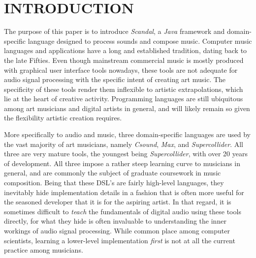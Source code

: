 \chapter{INTRODUCTION}

The purpose of this paper is to introduce \emph{Scandal}, a \emph{Java} framework and domain-specific language designed to process sounds and compose music. Computer music languages and applications have a long and established tradition, dating back to the late Fifties. Even though mainstream commercial music is mostly produced with graphical user interface tools nowadays, these tools are not adequate for audio signal processing with the specific intent of creating art music. The specificity of these tools render them inflexible to artistic extrapolations, which lie at the heart of creative activity. Programming languages are still ubiquitous among art musicians and digital artists in general, and will likely remain so given the flexibility artistic creation requires.

More specifically to audio and music, three domain-specific languages are used by the vast majority of art musicians, namely \emph{Csound}, \emph{Max}, and \emph{Supercollider}. All three are very mature tools, the youngest being \emph{Supercollider}, with over 20 years of development. All three impose a rather steep learning curve to musicians in general, and are commonly the subject of graduate coursework in music composition. Being that these DSL's are fairly high-level languages, they inevitably hide implementation details in a fashion that is often more useful for the seasoned developer that it is for the aspiring artist. In that regard, it is sometimes difficult to \emph{teach} the fundamentals of digital audio using these tools directly, for what they hide is often invaluable to understanding the inner workings of audio signal processing. While common place among computer scientists, learning a lower-level implementation \emph{first} is not at all the current practice among musicians.

